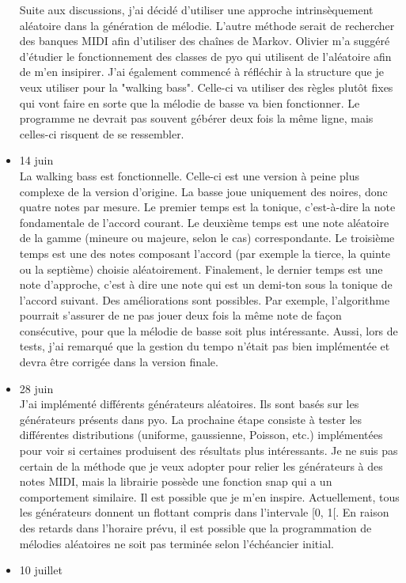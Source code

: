\documentclass[letterpaper,12pt]{scrartcl}
\begin{document}
\begin{itemize}
Suite aux discussions, j'ai décidé d'utiliser une approche intrinsèquement aléatoire dans la génération de mélodie. L'autre méthode serait de rechercher des banques MIDI afin d'utiliser des chaînes de Markov. Olivier m'a suggéré d'étudier le fonctionnement des classes de pyo qui utilisent de l'aléatoire afin de m'en insipirer. 
J'ai également commencé à réfléchir à la structure que je veux utiliser pour la "walking bass". Celle-ci va utiliser des règles plutôt fixes qui vont faire en sorte que la mélodie de basse va bien fonctionner. Le programme ne devrait pas souvent gébérer deux fois la même ligne, mais celles-ci risquent de se ressembler.
	\item 14 juin\\
	La walking bass est fonctionnelle. Celle-ci est une version à peine plus complexe de la version d'origine. La basse joue uniquement des noires, donc quatre notes par mesure. Le premier temps est la tonique, c'est-à-dire la note fondamentale de l'accord courant. Le deuxième temps est une note aléatoire de la gamme (mineure ou majeure, selon le cas) correspondante. Le troisième temps est une des notes composant l'accord (par exemple la tierce, la quinte ou la septième) choisie aléatoirement. Finalement, le dernier temps est une note d'approche, c'est à dire une note qui est un demi-ton sous la tonique de l'accord suivant. Des améliorations sont possibles. Par exemple, l'algorithme pourrait s'assurer de ne pas jouer deux fois la même note de façon consécutive, pour que la mélodie de basse soit plus intéressante. Aussi, lors de tests, j'ai remarqué que la gestion du tempo n'était pas bien implémentée et devra être corrigée dans la version finale. 
	\item 28 juin\\
	J'ai implémenté différents générateurs aléatoires. Ils sont basés sur les générateurs présents dans pyo. La prochaine étape consiste à tester les différentes distributions (uniforme, gaussienne, Poisson, etc.) implémentées pour voir si certaines produisent des résultats plus intéressants. Je ne suis pas certain de la méthode que je veux adopter pour relier les générateurs à des notes MIDI, mais la librairie possède une fonction snap qui a un comportement similaire. Il est possible que je m'en inspire. Actuellement, tous les générateurs donnent un flottant compris dans l'intervale [0, 1[. En raison des retards dans l'horaire prévu, il est possible que la programmation de mélodies aléatoires ne soit pas terminée selon l'échéancier initial.
	\item 10 juillet\\

\end{itemize}
\end{document}
